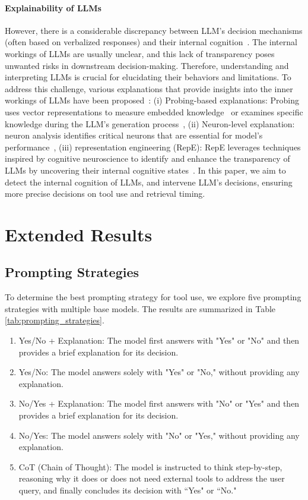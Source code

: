 \paragraph{Explainability of LLMs}
However, there is a considerable discrepancy between LLM's decision mechanisms (often based on verbalized responses) and their internal cognition~\citep{zou2023representation}. The internal workings of LLMs are usually unclear, and this lack of transparency poses unwanted risks in downstream decision-making. Therefore, understanding and interpreting LLMs is crucial for elucidating their behaviors and limitations. To address this challenge, various explanations that provide insights into the inner workings of LLMs have been proposed~\citep{zhao2024explainability}: 
(i) Probing-based explanations: Probing uses vector representations to measure embedded knowledge~\citep{peters2018dissecting, jawahar} or examines specific knowledge during the LLM's generation process~\citep{li2022probing}, (ii) Neuron-level explanation: neuron analysis identifies critical neurons that are essential for model's performance~\citep{antverg2021pitfalls,bills2023language}, (iii) representation engineering (RepE): RepE leverages techniques inspired by cognitive neuroscience to identify and enhance the transparency of LLMs by uncovering their internal cognitive states~\citep{zou2023representation}. In this paper, we aim to detect the internal cognition of LLMs, and intervene LLM's decisions, \ie ensuring more precise decisions on tool use and retrieval timing.



\section{Extended Results}\label{app:sec:extend_results}
\subsection{Prompting Strategies}

To determine the best prompting strategy for tool use, we explore five prompting strategies with multiple base models. The results are summarized in Table \ref{tab:prompting_strategies}.
\begin{enumerate} 
\item Yes/No + Explanation: The model first answers with "Yes" or "No" and then provides a brief explanation for its decision. 
\item Yes/No: The model answers solely with "Yes" or "No," without providing any explanation. 
\item No/Yes + Explanation: The model first answers with "No" or "Yes" and then provides a brief explanation for its decision. 
\item No/Yes: The model answers solely with "No" or "Yes," without providing any explanation. 
\item CoT (Chain of Thought): The model is instructed to think step-by-step, reasoning why it does or does not need external tools to address the user query, and finally concludes its decision with ``Yes" or ``No." 
\end{enumerate}


